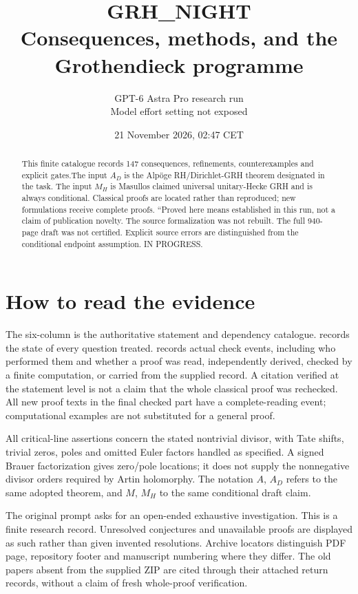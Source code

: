 \documentclass[11pt,a4paper]{article}
\title{\textbf{GRH\_NIGHT}\\Consequences, methods, and the Grothendieck programme}
\author{GPT-6 Astra Pro research run\\Model effort setting not exposed}
\date{21 November 2026, 02:\allowbreak{}47 CET}
\begin{document}
\maketitle
\begin{abstract}
This finite catalogue records 147 consequences, refinements, counterexamples and explicit gates.\allowbreak{}The input $A_D$ is the Alp\"oge RH/Dirichlet-GRH theorem designated in the task. The input $M_H$ is Masullo\textquotesingle s claimed universal unitary-Hecke GRH and is always conditional. Classical proofs are located rather than reproduced; new formulations receive complete proofs. ``Proved here means established in this run, not a claim of publication novelty. The source formalization was not rebuilt. The full 940-page draft was not certified. Explicit source errors are distinguished from the conditional endpoint assumption. IN PROGRESS.
\end{abstract}
\tableofcontents
\newpage
\section*{How to read the evidence}
The six-column  is the authoritative statement and
dependency catalogue.  records the state of every
question treated.  records actual check events,
including who performed them and whether a proof was read, independently
derived, checked by a finite computation, or carried from the supplied
record. A citation verified at the statement level is not a claim that the
whole classical proof was rechecked. All new proof texts in the final
checked part have a complete-reading event; computational examples are
not substituted for a general proof.

All critical-line assertions concern the stated nontrivial divisor, with
Tate shifts, trivial zeros, poles and omitted Euler factors handled as
specified. A signed Brauer factorization gives zero/pole locations; it
does not supply the nonnegative divisor orders required by Artin
holomorphy. The notation $A$, $A_D$ refers to the same adopted theorem,
and $M$, $M_H$ to the same conditional draft claim.

The original prompt asks for an open-ended exhaustive investigation.
This is a finite research record. Unresolved conjectures and unavailable
proofs are displayed as such rather than given invented resolutions.
Archive locators distinguish PDF page, repository footer and manuscript
numbering where they differ. The old papers absent from the supplied ZIP
are cited through their attached return records, without a claim of fresh
whole-proof verification.
\end{document}

